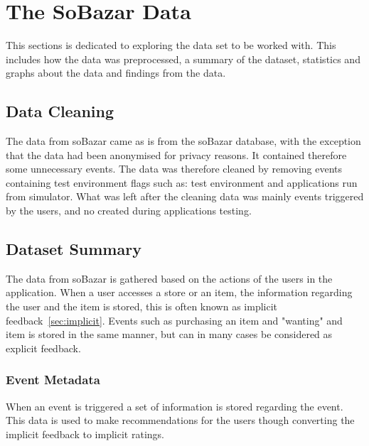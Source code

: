 
\chapter{The SoBazar Data}
\minitoc
    This sections is dedicated to exploring the data set to be worked with.
    This includes how the data was preprocessed, a summary of the dataset, statistics and graphs about the data and findings from the data.


\section{Data Cleaning}
    The data from soBazar came as is from the soBazar database, with the exception that the data had been anonymised for privacy reasons.
    It contained therefore some unnecessary events.
    The data was therefore cleaned by removing events containing test environment flags such as: test environment and applications run from simulator.
    What was left after the cleaning data was mainly events triggered by the users, and no created during applications testing.

\section{Dataset Summary}
    The data from soBazar is gathered based on the actions of the users in the application.
    When a user accesses a store or an item, the information regarding the user and the item is stored, this is often known as implicit feedback~\ref{sec:implicit}.
    Events such as purchasing an item and "wanting" and item is stored in the same manner, but can in many cases be considered as explicit feedback.

\subsection{Event Metadata}
    When an event is triggered a set of information is stored regarding the event.
    This data is used to make recommendations for the users though converting the implicit feedback to implicit ratings.


